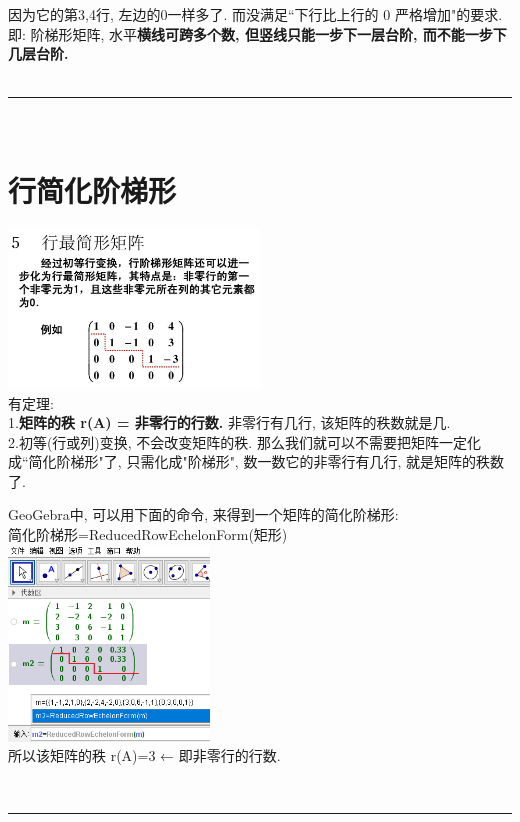 \documentclass[UTF8]{ctexart}
\begin{document}
因为它的第3,4行, 左边的0一样多了. 而没满足``下行比上行的 0 严格增加"的要求.\\
即: 阶梯形矩阵, 水平\textbf{横线可跨多个数, 但竖线只能一步下一层台阶, 而不能一步下几层台阶.} \\


~\\
\hrule
~\\


\section{行简化阶梯形}

\includegraphics[width=0.5\textwidth]{img/0064.png}\\

有定理:\\
1.\textbf{矩阵的秩 r(A) = 非零行的行数.} 非零行有几行, 该矩阵的秩数就是几. \\
2.初等(行或列)变换, 不会改变矩阵的秩. 那么我们就可以不需要把矩阵一定化成``简化阶梯形"了, 只需化成"阶梯形", 数一数它的非零行有几行, 就是矩阵的秩数了. \\

\begin{myEnvSample}
	GeoGebra中, 可以用下面的命令, 来得到一个矩阵的简化阶梯形: \\
	简化阶梯形=ReducedRowEchelonForm(矩形)\\
	
\includegraphics[width=0.4\textwidth]{img/0065.png} \\

所以该矩阵的秩 r(A)=3 ← 即非零行的行数.
\end{myEnvSample}

~\\
\hrule
~\\
\end{document}
